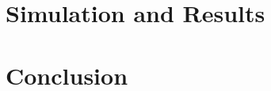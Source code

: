 \documentclass[10pt]{llncs}
\begin{document}


%
\section{Simulation and Results}


%
\section{Conclusion}
 
%

%

\footnotesize{
%
%
}
%
\end{document}
